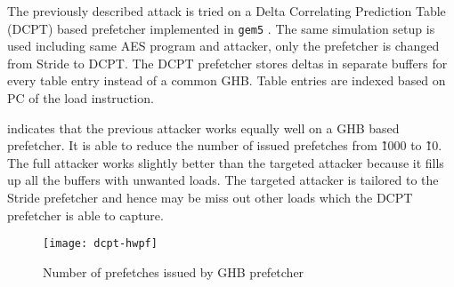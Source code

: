 The previously described attack is tried on a Delta Correlating Prediction Table
(DCPT)  based prefetcher implemented in \texttt{gem5} .
The same simulation setup is used including same AES program and attacker, only
the prefetcher is changed from Stride to DCPT.
The DCPT prefetcher stores deltas in separate buffers for every table entry instead
of a common GHB. Table entries are indexed based on PC of the load instruction.

 indicates that the previous attacker works equally well on
a GHB based prefetcher. It is able to reduce the number of issued prefetches from \~1000
to \~10. The full attacker works slightly better than the targeted attacker because
it fills up all the buffers with unwanted loads. The targeted attacker is tailored to
the Stride prefetcher and hence may be miss out other loads which the DCPT prefetcher
is able to capture.

\begin{figure}[h]
    \centering
    \texttt{[image: dcpt-hwpf]}
    \caption{Number of prefetches issued by GHB prefetcher}
    \label{fig:targeted_dcpt}
\end{figure}

